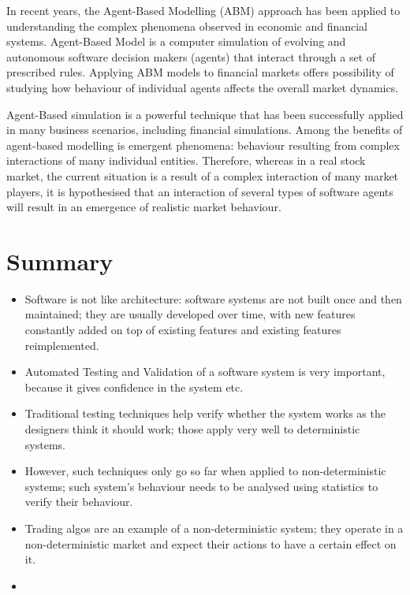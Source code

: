 In recent years, the Agent-Based Modelling (ABM) approach has been applied to understanding the complex phenomena observed in economic and financial systems. Agent-Based Model is a computer simulation of evolving and autonomous software decision makers (agents) that interact through a set of prescribed rules. Applying ABM models to financial markets offers possibility of studying how behaviour of individual agents affects the overall market dynamics. \cite{Sorban2008} \cite{Farmer2009}




\pagebreak

Agent-Based simulation is a powerful technique that has been successfully applied in many business scenarios, including financial simulations. Among the benefits of agent-based modelling is emergent phenomena: behaviour resulting from complex interactions of many individual entities.
Therefore, whereas in a real stock market, the current situation is a result of a complex interaction of many market players, it is hypothesised that an interaction of several types of software agents will result in an emergence of realistic market behaviour.

\section{Summary}
\begin{itemize}
\item Software is not like architecture: software systems are not built once and then maintained; they are usually developed over time, with new features constantly added on top of existing features and existing features reimplemented.
\item Automated Testing and Validation of a software system is very important, because it gives confidence in the system etc.
\item Traditional testing techniques help verify whether the system works as the designers think it should work; those apply very well to deterministic systems.
\item However, such techniques only go so far when applied to non-deterministic systems; such system's behaviour needs to be analysed using statistics to verify their behaviour.
\item Trading algos are an example of a non-deterministic system; they operate in a non-deterministic market and expect their actions to have a certain effect on it.
\item  
\end{itemize}